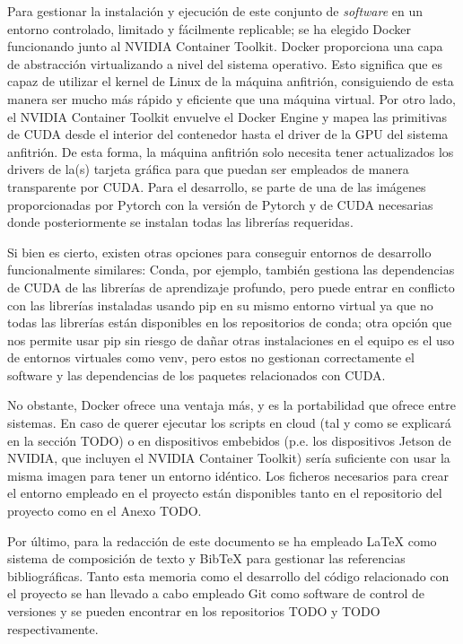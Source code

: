 Para gestionar la instalación y ejecución de este conjunto de \textit{software} en un entorno controlado, limitado y fácilmente replicable; se ha elegido Docker funcionando junto al NVIDIA Container Toolkit. Docker proporciona una capa de abstracción virtualizando a nivel del sistema operativo. Esto significa que es capaz de utilizar el kernel de Linux de la máquina anfitrión, consiguiendo de esta manera ser mucho más rápido y eficiente que una máquina virtual. Por otro lado, el NVIDIA Container Toolkit envuelve el Docker Engine y mapea las primitivas de CUDA desde el interior del contenedor hasta el driver de la GPU del sistema anfitrión. De esta forma, la máquina anfitrión solo necesita tener actualizados los drivers de la(s) tarjeta gráfica para que puedan ser empleados de manera transparente por CUDA. Para el desarrollo, se parte de una de las imágenes proporcionadas por Pytorch con la versión de Pytorch y de CUDA necesarias donde posteriormente se instalan todas las librerías requeridas. 

Si bien es cierto, existen otras opciones para conseguir entornos de desarrollo funcionalmente similares: Conda, por ejemplo, también gestiona las dependencias de CUDA de las librerías de aprendizaje profundo, pero puede entrar en conflicto con las librerías instaladas usando pip en su mismo entorno virtual ya que no todas las librerías están disponibles en los repositorios de conda; otra opción que nos permite usar pip sin riesgo de dañar otras instalaciones en el equipo es el uso de entornos virtuales como venv, pero estos no gestionan correctamente el software y las dependencias de los paquetes relacionados con CUDA. 

No obstante, Docker ofrece una ventaja más, y es la portabilidad que ofrece entre sistemas. En caso de querer ejecutar los scripts en cloud (tal y como se explicará en la sección TODO) o en dispositivos embebidos (p.e. los dispositivos Jetson de NVIDIA, que incluyen el NVIDIA Container Toolkit) sería suficiente con usar la misma imagen para tener un entorno idéntico. Los ficheros necesarios para crear el entorno empleado en el proyecto están disponibles tanto en el repositorio del proyecto como en el Anexo TODO.

Por último, para la redacción de este documento se ha empleado LaTeX como sistema de composición de texto y BibTeX para gestionar las referencias bibliográficas. Tanto esta memoria como el desarrollo del código relacionado con el proyecto se han llevado a cabo empleado Git como software de control de versiones y se pueden encontrar en los repositorios TODO y TODO respectivamente.

